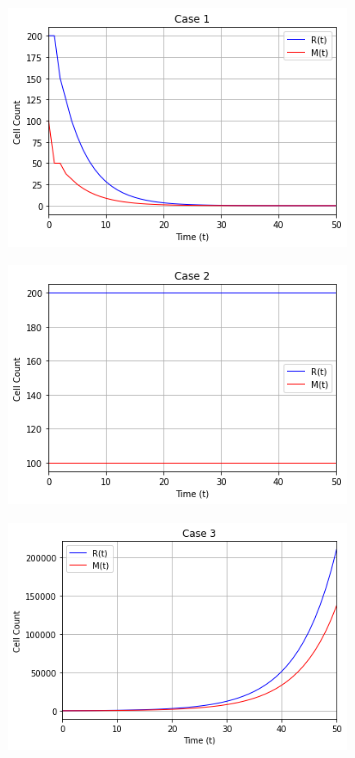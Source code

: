 \documentclass [a4paper]{article}
\begin{document}
\begin{figure}[h] 
    \centering 
    \includegraphics[width=0.80\textwidth]{Case 1.png} 
\end{figure}
\newpage
\begin{figure}[h]
    \centering 
    \includegraphics[width=0.80\textwidth]{Case 2.png} 
\end{figure}
\begin{figure}[h] 
    \centering 
    \includegraphics[width=0.80\textwidth]{Case 3.png} 
\end{figure}
\newpage
\end{document}
